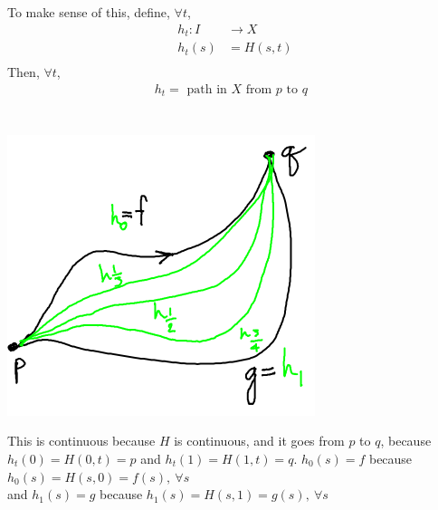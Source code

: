    \begin{itemize}
            To make sense of this, define, $\forall t$,
            \begin{align*}
                h_t: I&\rightarrow X\\
                h_t(s)&=H(s,t)\\
            \end{align*}
            Then, $\forall t$,
            \begin{align*}
                h_t= \text{ path in $X$ from $p$ to $q$ }\\
            \end{align*}\\
            \begin{minipage}[c]{\linewidth}
                \begin{center}
                \includegraphics[]{images/homotopy_class.png}
                \end{center}
            \end{minipage}
            This is continuous because $H$ is continuous, and it goes from $p$ to $q$, because $h_t(0)=H(0,t)=p$ and $h_t(1)=H(1,t)=q$.
            $h_0(s)=f$ because $h_0(s)=H(s,0)=f(s),\ \forall s$\\
            and $h_1(s)=g$ because $h_1(s)=H(s,1)=g(s),\ \forall s$\\
    \end{itemize}
